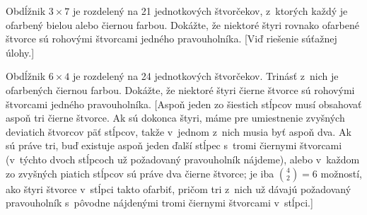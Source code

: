 {Obdĺžnik $3\times7$ je rozdelený na 21 jednotkových štvorčekov,
z~ktorých každý je ofarbený bielou alebo čiernou farbou. Dokážte, že
niektoré štyri rovnako ofarbené štvorce sú rohovými štvorcami jedného
pravouholníka. [Viď riešenie súťažnej úlohy.]

Obdĺžnik $6\times4$ je rozdelený na 24 jednotkových štvorčekov.
Trinásť z~nich je ofarbených čiernou farbou. Dokážte, že niektoré
štyri čierne štvorce sú rohovými štvorcami jedného pravouholníka.
[Aspoň jeden zo šiestich stĺpcov musí obsahovať aspoň tri čierne
štvorce. Ak sú dokonca štyri, máme pre umiestnenie zvyšných
deviatich štvorcov päť stĺpcov, takže v~jednom z~nich musia byť
aspoň dva. Ak sú práve tri, buď existuje aspoň jeden ďalší
stĺpec s~tromi čiernymi štvorcami (v~týchto dvoch stĺpcoch už
požadovaný pravouholník nájdeme), alebo v~každom zo zvyšných
piatich stĺpcov sú práve dva čierne štvorce; je iba $\binom42=6$
možností, ako štyri štvorce v~stĺpci takto ofarbiť, pričom tri
z~nich už dávajú požadovaný pravouholník s~pôvodne nájdenými tromi
čiernymi štvorcami v~stĺpci.]
}

